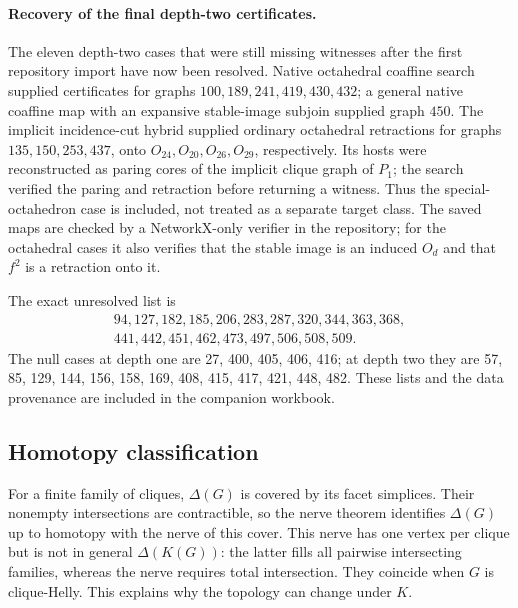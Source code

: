 \documentclass[11pt,a4paper]{article}
\theoremstyle{definition}\newtheorem{definition}[theorem]{Definition}\newtheorem{example}[theorem]{Example}
\theoremstyle{remark}\newtheorem{remark}[theorem]{Remark}
\begin{document}
\paragraph{Recovery of the final depth-two certificates.}
The eleven depth-two cases that were still missing witnesses after the first repository import have now been resolved. Native octahedral coaffine search supplied certificates for graphs
\(100,189,241,419,430,432\); a general native coaffine map with an expansive stable-image subjoin supplied graph \(450\). The implicit incidence-cut hybrid supplied ordinary octahedral retractions for graphs \(135,150,253,437\), onto \(O_{24},O_{20},O_{26},O_{29}\), respectively. Its hosts were reconstructed as paring cores of the implicit clique graph of \(P_1\); the search verified the paring and retraction before returning a witness. Thus the special-octahedron case is included, not treated as a separate target class. The saved maps are checked by a NetworkX-only verifier in the repository; for the octahedral cases it also verifies that the stable image is an induced \(O_d\) and that \(f^2\) is a retraction onto it.

\begin{center}
\end{center}
The exact unresolved list is
\[
\begin{gathered}
94,127,182,185,206,283,287,320,344,363,368,\\
441,442,451,462,473,497,506,508,509.
\end{gathered}
\]
The null cases at depth one are 27, 400, 405, 406, 416; at depth two they are 57, 85, 129, 144, 156, 158, 169, 408, 415, 417, 421, 448, 482. These lists and the data provenance are included in the companion workbook.

\subsection{Homotopy classification}
For a finite family of cliques, \(\Delta(G)\) is covered by its facet simplices. Their nonempty intersections are contractible, so the nerve theorem identifies \(\Delta(G)\) up to homotopy with the nerve of this cover. This nerve has one vertex per clique but is not in general \(\Delta(K(G))\): the latter fills all pairwise intersecting families, whereas the nerve requires total intersection. They coincide when \(G\) is clique-Helly. This explains why the topology can change under \(K\).
\end{document}
